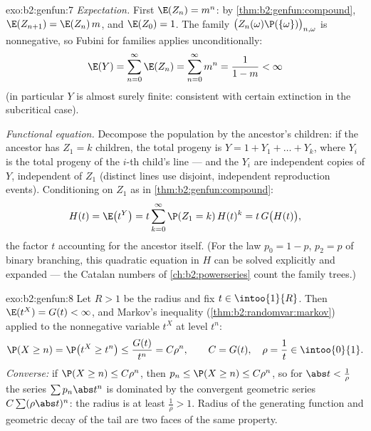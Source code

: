 \begin{solution}{exo:b2:genfun:7}
\emph{Expectation.} First $\E(Z_n) = m^n$: by
\cref{thm:b2:genfun:compound}, $\E(Z_{n+1}) = \E(Z_n)\,m$, and
$\E(Z_0) = 1$. The family $\bigl(Z_n(\omega)\P(\{\omega\})
\bigr)_{n, \omega}$ is nonnegative, so Fubini for families applies
unconditionally:
\[
\E(Y) = \sum_{n=0}^{\infty}\E(Z_n)
= \sum_{n=0}^\infty m^n = \frac{1}{1 - m} < \infty
\]
(in particular $Y$ is almost surely finite: consistent with
certain extinction in the subcritical case).

\emph{Functional equation.} Decompose the population by the
ancestor's children: if the ancestor has $Z_1 = k$ children, the
total progeny is $Y = 1 + Y_1 + \dots + Y_k$, where $Y_i$ is the
total progeny of the $i$-th child's line --- and the $Y_i$ are
independent copies of $Y$, independent of $Z_1$ (distinct lines
use disjoint, independent reproduction events). Conditioning on
$Z_1$ as in \cref{thm:b2:genfun:compound}:
\[
H(t) = \E\bigl(t^Y\bigr)
= t\sum_{k=0}^\infty \P(Z_1 = k)\,H(t)^k
= t\,G\bigl(H(t)\bigr),
\]
the factor $t$ accounting for the ancestor itself. (For the
law $p_0 = 1 - p$, $p_2 = p$ of binary branching, this quadratic
equation in $H$ can be solved explicitly and expanded --- the
Catalan numbers of \cref{ch:b2:powerseries} count the family
trees.)
\end{solution}

\begin{solution}{exo:b2:genfun:8}
Let $R > 1$ be the radius and fix $t \in \intoo{1}{R}$. Then
$\E(t^X) = G(t) < \infty$, and Markov's inequality
(\cref{thm:b2:randomvar:markov}) applied to the nonnegative
variable $t^X$ at level $t^n$:
\[
\P(X \geq n) = \P\bigl(t^X \geq t^n\bigr)
\leq \frac{G(t)}{t^n} = C\rho^n,
\qquad C = G(t),\quad \rho = \frac1t \in \intoo{0}{1}.
\]
\emph{Converse:} if $\P(X \geq n) \leq C\rho^n$, then $p_n \leq
\P(X \geq n) \leq C\rho^n$, so for $\abs t < \frac1\rho$ the
series $\sum p_n\abs t^n$ is dominated by the convergent geometric
series $C\sum(\rho\abs t)^n$: the radius is at least
$\frac1\rho > 1$. Radius of the generating function and geometric
decay of the tail are two faces of the same property.
\end{solution}

